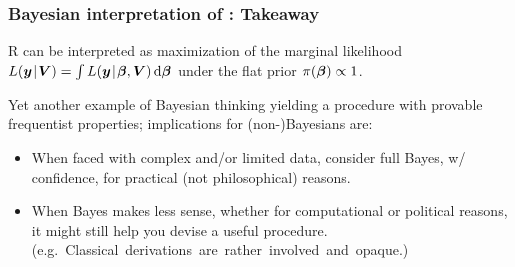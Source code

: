 \documentclass[18pt]{beamer}
\newcommand{\lse}[1]{\widehat{#1}_{\scriptsize \text{\tiny \rmfamily LS}}} %
\newcommand{\frametitleText}{This is a frame title}
\begin{document}
\renewcommand{\frametitleText}{Bayesian interpretation of : Takeaway}
\begin{frame}
\frametitle{\frametitleText}
R can be interpreted as maximization of the marginal likelihood 
$\likelihood(
	\by \given \bm{V}
)	
	= 
	\int 
		\likelihood(\by \given \bbeta, \bm{V})
	\diff \bbeta \thinnerspace$
under the flat prior $\thinnerspace \density(\bbeta) \propto 1$.


\pause
\medskip
Yet another example of Bayesian thinking yielding a procedure with provable frequentist properties;
implications for (non-)Bayesians are:%
\pause%
\vspace{-.3\baselineskip}%
\begin{itemize}
\addtolength\itemsep{.08\baselineskip}
\item When faced with complex and/or limited data, consider full Bayes, w/ confidence, for practical (not philosophical) reasons.
\pause%
\item When Bayes makes less sense, whether for computational or political reasons, it might still help you devise a useful procedure.\\[3pt]
	\mbox{(e.g.\ Classical  derivations are rather involved and opaque.)}
\end{itemize}
\end{frame}
\end{document}
